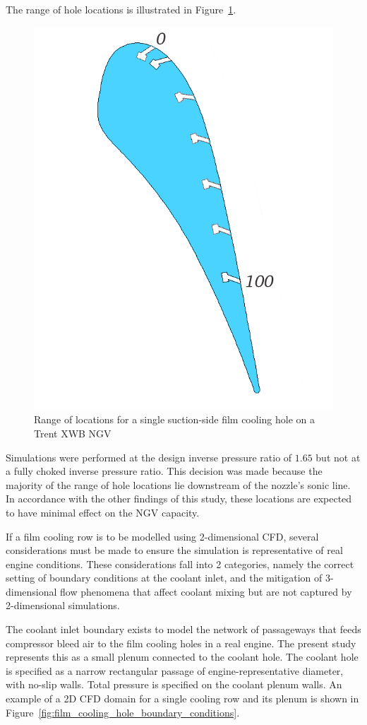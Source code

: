 \documentclass[a4paper, 11pt, oneside]{report}
\begin{document}
The range of hole locations is illustrated in Figure~\ref{fig:SCH_hole_range}.

\begin{figure}[H]
	\centering
	\includegraphics[width=.45\textwidth]{figs/SCH_hole_range.png}
	\caption{Range of locations for a single suction-side film cooling hole on a Trent XWB NGV}
    \label{fig:SCH_hole_range}
\end{figure}

Simulations were performed at the design inverse pressure ratio of $1.65$ but not at a fully choked inverse pressure ratio. This decision was made because the majority of the range of hole locations lie downstream of the nozzle's sonic line. In accordance with the other findings of this study, these locations are expected to have minimal effect on the NGV capacity.

If a film cooling row is to be modelled using 2-dimensional CFD, several considerations must be made to ensure the simulation is representative of real engine conditions. These considerations fall into 2 categories, namely the correct setting of boundary conditions at the coolant inlet, and the mitigation of 3-dimensional flow phenomena that affect coolant mixing but are not captured by 2-dimensional simulations.

The coolant inlet boundary exists to model the network of passageways that feeds compressor bleed air to the film cooling holes in a real engine. The present study represents this as a small plenum connected to the coolant hole. The coolant hole is specified as a narrow rectangular passage of engine-representative diameter, with no-slip walls. Total pressure is specified on the coolant plenum walls. An example of a 2D CFD domain for a single cooling row and its plenum is shown in Figure~\ref{fig:film_cooling_hole_boundary_conditions}.
\end{document}
